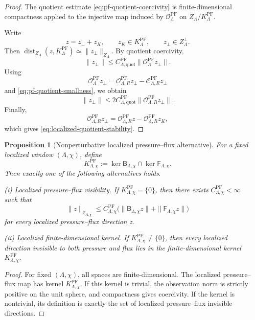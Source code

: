 \documentclass[11pt]{article}
\numberwithin{equation}{section}
\theoremstyle{plain}
\newtheorem{proposition}[theorem]{Proposition}
\theoremstyle{definition}
\theoremstyle{remark}
\newcommand{\PF}{\mathrm{PF}}
\newcommand{\quot}{\mathrm{quot}}
\newcommand{\dist}{\operatorname{dist}}
\newcommand{\calC}{\mathcal C}
\newcommand{\calO}{\mathcal O}
\newcommand{\Bop}{\mathsf B}
\newcommand{\Fop}{\mathsf F}
\begin{document}
\begin{proof}
The quotient estimate \eqref{eq:pf-quotient-coercivity} is finite-dimensional compactness applied to the injective map induced by \(\calO^{\PF}_\Lambda\) on \(Z_\Lambda/K^{\PF}_\Lambda\).

Write
\[
        z=z_\perp+z_K,
        \qquad
        z_K\in K^{\PF}_\Lambda,
        \qquad
        z_\perp\in Z_\Lambda^\perp.
\]
Then \(\dist_{Z_\Lambda}(z,K^{\PF}_\Lambda)\simeq\|z_\perp\|_{Z_\Lambda}\).  By quotient coercivity,
\[
        \|z_\perp\|
        \le
        C^{\PF}_{\Lambda,\quot}
        \|\calO^{\PF}_\Lambda z_\perp\|.
\]
Using
\[
        \calO^{\PF}_\Lambda z_\perp
        =
        \calO^{\PF}_{\Lambda,R}z_\perp-
        \calC^{\PF}_{\Lambda,R}z_\perp
\]
and \eqref{eq:pf-quotient-smallness}, we obtain
\[
        \|z_\perp\|
        \le
        2C^{\PF}_{\Lambda,\quot}
        \|\calO^{\PF}_{\Lambda,R}z_\perp\|.
\]
Finally,
\[
        \calO^{\PF}_{\Lambda,R}z_\perp
        =
        \calO^{\PF}_{\Lambda,R}z-
        \calO^{\PF}_{\Lambda,R}z_K,
\]
which gives \eqref{eq:localized-quotient-stability}.
\end{proof}

\begin{proposition}[Nonperturbative localized pressure--flux alternative]
\label{prop:pf-nonperturbative-localized-alternative}
For a fixed localized window \((\Lambda,\chi)\), define
\[
        K^{\PF}_{\Lambda,\chi}
        :=
        \ker\Bop_{\Lambda,\chi}\cap\ker\Fop_{\Lambda,\chi}.
\]
Then exactly one of the following alternatives holds.

\smallskip
\noindent\textup{(i) Localized pressure--flux visibility.}
If \(K^{\PF}_{\Lambda,\chi}=\{0\}\), then there exists \(C^{\PF}_{\Lambda,\chi}<\infty\) such that
\[
        \|z\|_{Z_{\Lambda,\chi}}
        \le
        C^{\PF}_{\Lambda,\chi}
        \bigl(
            \|\Bop_{\Lambda,\chi}z\|+
            \|\Fop_{\Lambda,\chi}z\|
        \bigr)
\]
for every localized pressure--flux direction \(z\).

\smallskip
\noindent\textup{(ii) Localized finite-dimensional kernel.}
If \(K^{\PF}_{\Lambda,\chi}\neq\{0\}\), then every localized direction invisible to both pressure and flux lies in the finite-dimensional kernel \(K^{\PF}_{\Lambda,\chi}\).
\end{proposition}

\begin{proof}
For fixed \((\Lambda,\chi)\), all spaces are finite-dimensional.  The localized pressure--flux map has kernel \(K^{\PF}_{\Lambda,\chi}\).  If this kernel is trivial, the observation norm is strictly positive on the unit sphere, and compactness gives coercivity.  If the kernel is nontrivial, its definition is exactly the set of localized pressure--flux invisible directions.
\end{proof}
\end{document}
